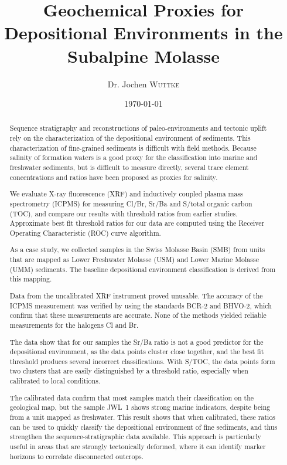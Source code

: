 \documentclass[bscthesis]{../eapsthesis}
\title{Geochemical Proxies for Depositional Environments in the Subalpine Molasse}
\date{\today}
\author{Dr. Jochen \textsc{Wuttke}}
\begin{document}
\maketitle

\onehalfspace  %
\frontmatter

\begin{abstract}
Sequence stratigraphy and reconstructions of paleo-environments and tectonic uplift rely on the 
characterization
of the depositional environment of sediments. This characterization of fine-grained sediments is difficult
with field methods. Because salinity of formation waters is a good proxy for
the classification into marine and freshwater sediments, but is difficult to measure directly, 
several trace element concentrations and ratios have been proposed as proxies for salinity. 

We evaluate  X-ray fluorescence (XRF) and  inductively coupled plasma mass spectrometry (ICPMS) for
measuring Cl/Br, Sr/Ba and S/total organic carbon (TOC), and compare our results with threshold ratios from
earlier studies. Approximate best fit threshold ratios for our data are computed using the 
Receiver Operating Characteristic (ROC) curve algorithm. 

As a case study, we collected samples in the Swiss Molasse Basin (SMB) from units that are mapped as 
Lower Freshwater Molasse (USM) and Lower Marine Molasse (UMM) sediments. 
The baseline depositional environment classification is derived from this mapping.

Data from the uncalibrated XRF instrument proved unusable. 
The accuracy of the ICPMS 
measurement was verified by using the standards BCR-2 and BHVO-2, which confirm that these measurements
are accurate. 
None of the methods yielded reliable measurements for the halogens Cl and Br. 

The data show that for our samples the Sr/Ba ratio is not a good predictor for the depositional
environment, as the data points cluster close together, 
and the best fit threshold produces several incorrect classifications. 
With S/TOC, the data points form two clusters that are easily distinguished by
a threshold ratio, especially when calibrated to local conditions.

The calibrated data confirm that most samples match their classification on the geological map, but
the sample JWL~1 shows strong marine indicators, despite being from a unit mapped as freshwater.
This result shows that when calibrated, these ratios can be used to quickly classify the depositional
environment of fine sediments, and thus strengthen the sequence-stratigraphic data available. This approach is 
particularly useful in areas that are strongly tectonically deformed, where it can identify marker horizons 
to correlate disconnected outcrops.

\end{abstract}
\end{document}
